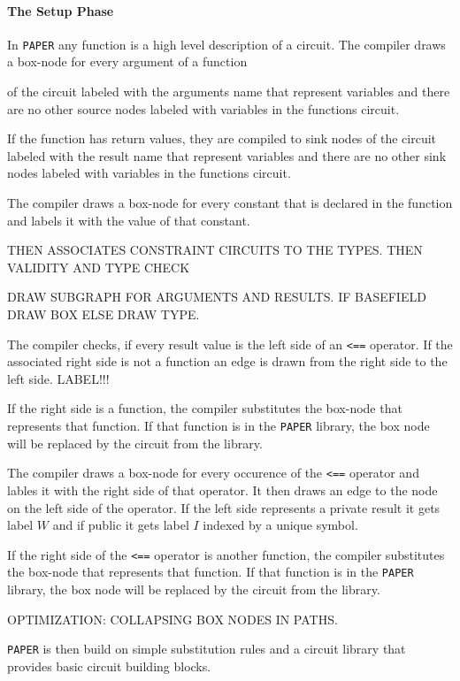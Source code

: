 \paragraph{The Setup Phase}
In \texttt{PAPER} any function is a high level description of a circuit. The compiler draws a box-node for every argument of a function 

of the circuit labeled with the arguments name that represent variables and there are no other source nodes labeled with variables in the functions circuit. 

If the function has return values, they are compiled to sink nodes of the circuit labeled with the result name that represent variables and there are no other sink nodes labeled with variables in the functions circuit. 

The compiler draws a box-node for every constant that is declared in the function and labels it with the value of that constant.

THEN ASSOCIATES CONSTRAINT CIRCUITS TO THE TYPES. THEN VALIDITY AND TYPE CHECK

DRAW SUBGRAPH FOR ARGUMENTS AND RESULTS. IF BASEFIELD DRAW BOX ELSE DRAW TYPE.

The compiler checks, if every result value is the left side of an \texttt{<==} operator. If the associated right side is not a function an edge is drawn from the right side to the left side. LABEL!!! 

If the right side is a function, the compiler substitutes the box-node that represents that function. If that function is in the \texttt{PAPER} library, the box node will be replaced by the circuit from the library. 

The compiler draws a box-node for every occurence of the \texttt{<==} operator and lables it with the right side of that operator. It then draws an edge to the node on the left side of the operator. If the left side represents a private result it gets label $W$ and if public it gets label $I$ indexed by a unique symbol.

If the right side of the \texttt{<==} operator is another function, the compiler substitutes the box-node that represents that function. If that function is in the \texttt{PAPER} library, the box node will be replaced by the circuit from the library. 

OPTIMIZATION: COLLAPSING BOX NODES IN PATHS.

\texttt{PAPER} is then build on simple substitution rules and a circuit library that provides basic circuit building blocks.  





